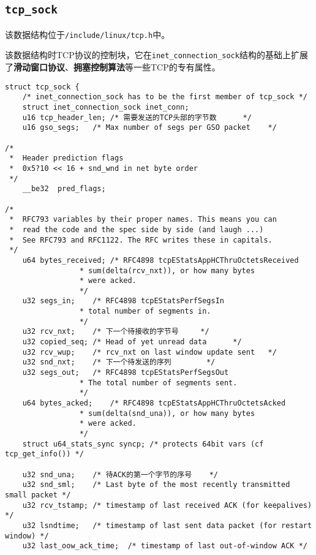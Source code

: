         \subsection{\texttt{tcp_sock}}

            该数据结构位于\texttt{/include/linux/tcp.h}中。

            该数据结构时TCP协议的控制块，它在\texttt{inet_connection_sock}结构的基础上扩展了\textbf{滑动窗口协议}、\textbf{拥塞控制算法}等一些TCP的专有属性。
            
\begin{verbatim}
struct tcp_sock {
    /* inet_connection_sock has to be the first member of tcp_sock */
    struct inet_connection_sock inet_conn;
    u16 tcp_header_len; /* 需要发送的TCP头部的字节数      */
    u16 gso_segs;   /* Max number of segs per GSO packet    */

/*
 *  Header prediction flags
 *  0x5?10 << 16 + snd_wnd in net byte order
 */
    __be32  pred_flags;

/*
 *  RFC793 variables by their proper names. This means you can
 *  read the code and the spec side by side (and laugh ...)
 *  See RFC793 and RFC1122. The RFC writes these in capitals.
 */
    u64 bytes_received; /* RFC4898 tcpEStatsAppHCThruOctetsReceived
                 * sum(delta(rcv_nxt)), or how many bytes
                 * were acked.
                 */
    u32 segs_in;    /* RFC4898 tcpEStatsPerfSegsIn
                 * total number of segments in.
                 */
    u32 rcv_nxt;    /* 下一个待接收的字节号     */
    u32 copied_seq; /* Head of yet unread data      */
    u32 rcv_wup;    /* rcv_nxt on last window update sent   */
    u32 snd_nxt;    /* 下一个待发送的序列        */
    u32 segs_out;   /* RFC4898 tcpEStatsPerfSegsOut
                 * The total number of segments sent.
                 */
    u64 bytes_acked;    /* RFC4898 tcpEStatsAppHCThruOctetsAcked
                 * sum(delta(snd_una)), or how many bytes
                 * were acked.
                 */
    struct u64_stats_sync syncp; /* protects 64bit vars (cf tcp_get_info()) */

    u32 snd_una;    /* 待ACK的第一个字节的序号    */
    u32 snd_sml;    /* Last byte of the most recently transmitted small packet */
    u32 rcv_tstamp; /* timestamp of last received ACK (for keepalives) */
    u32 lsndtime;   /* timestamp of last sent data packet (for restart window) */
    u32 last_oow_ack_time;  /* timestamp of last out-of-window ACK */


\end{verbatim}
